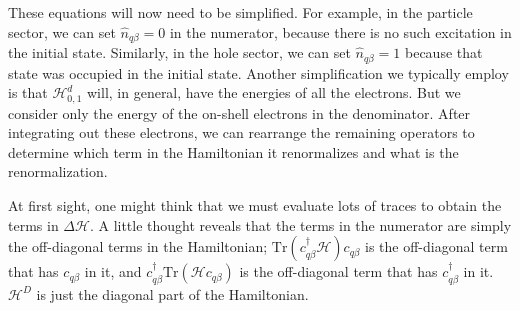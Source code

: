 These equations will now need to be simplified. For example, in the particle sector, we can set \(\hat n_{q\beta}=0\) in the numerator, because there is no such excitation in the initial state. Similarly, in  the hole sector, we can set \(\hat n_{q\beta}=1\) because that state was occupied in the initial state. Another simplification we typically employ is that \(\mathcal{H}^d_{0,1}\) will, in general, have the energies of all the electrons. But we consider only the energy of the on-shell electrons in the denominator. After integrating out these electrons, we can rearrange the remaining operators to determine which term in the Hamiltonian it renormalizes and what is the renormalization.

At first sight, one might think that we must evaluate lots of traces to obtain the terms in \(\Delta \mathcal{H}\). A little thought reveals that the terms in the numerator are simply the off-diagonal terms in the Hamiltonian; \(\text{Tr}\left(c^\dagger_{q\beta}\mathcal{H} \right)c_{q\beta}\) is the off-diagonal term that has \(c_{q\beta}\) in it, and \(c_{q\beta}^\dagger \text{Tr}\left(\mathcal{H} c_{q\beta}\right)\) is the off-diagonal term that has \(c^\dagger_{q\beta}\) in it. \(\mathcal{H}^D\) is just the diagonal part of the Hamiltonian.
